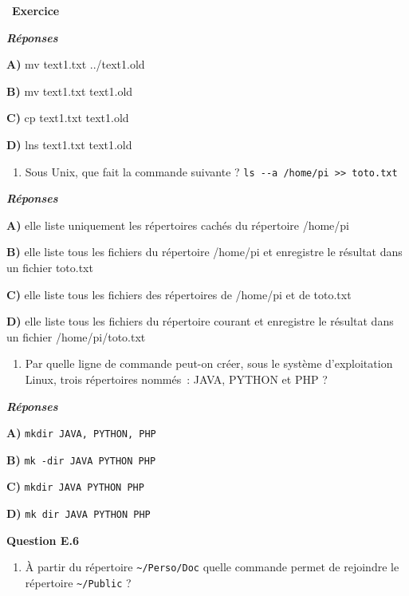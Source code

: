 \documentclass[
  11pt,
]{article}
\providecommand{\tightlist}{%
  \setlength{\itemsep}{0pt}\setlength{\parskip}{0pt}}
\newcounter{exo}
\newenvironment{exercice}[1]
{\par \medskip   \addtocounter{exo}{1} \noindent  
\begin{bclogo}[arrondi =0.1,   noborder = true, logo=\bccrayon, marge=4]{~\textbf{Exercice} \textbf{\theexo} {\itshape #1} }  \par}
{
\end{bclogo}
 \par \bigskip }
\newcounter{def}
\begin{document}
\begin{exercice}{}
\textbf{\emph{Réponses}}

\textbf{A)} mv text1.txt ../text1.old

\textbf{B)} mv text1.txt text1.old

\textbf{C)} cp text1.txt text1.old

\textbf{D)} lns text1.txt text1.old

\begin{enumerate}
\def\labelenumi{\arabic{enumi}.}
\setcounter{enumi}{6}
\tightlist
\item
  Sous Unix, que fait la commande suivante ?
  \texttt{ls\ -\/-a\ /home/pi\ \textgreater{}\textgreater{}\ toto.txt}
\end{enumerate}

\textbf{\emph{Réponses}}

\textbf{A)} elle liste uniquement les répertoires cachés du répertoire
/home/pi

\textbf{B)} elle liste tous les fichiers du répertoire /home/pi et
enregistre le résultat dans un fichier toto.txt

\textbf{C)} elle liste tous les fichiers des répertoires de /home/pi et
de toto.txt

\textbf{D)} elle liste tous les fichiers du répertoire courant et
enregistre le résultat dans un fichier /home/pi/toto.txt

\begin{enumerate}
\def\labelenumi{\arabic{enumi}.}
\setcounter{enumi}{7}
\tightlist
\item
  Par quelle ligne de commande peut-on créer, sous le système
  d'exploitation Linux, trois répertoires nommés~: JAVA, PYTHON et PHP ?
\end{enumerate}

\textbf{\emph{Réponses}}

\textbf{A)} \texttt{mkdir\ JAVA,\ PYTHON,\ PHP}

\textbf{B)} \texttt{mk\ -dir\ JAVA\ PYTHON\ PHP}

\textbf{C)} \texttt{mkdir\ JAVA\ PYTHON\ PHP}

\textbf{D)} \texttt{mk\ dir\ JAVA\ PYTHON\ PHP}

\textbf{Question E.6}

\begin{enumerate}
\def\labelenumi{\arabic{enumi}.}
\setcounter{enumi}{8}
\tightlist
\item
  À partir du répertoire \texttt{\textasciitilde{}/Perso/Doc} quelle
  commande permet de rejoindre le répertoire
  \texttt{\textasciitilde{}/Public} ?
\end{enumerate}


\end{exercice}
\end{document}
